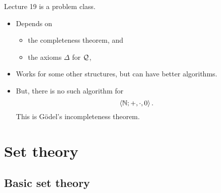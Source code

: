 
Lecture 19 is a problem class.


\begin{note*}
\hfill
\begin{itemize}
\item Depends on
\begin{itemize}
\item the completeness theorem, and
\item the axioms $ \Delta $ for $ \mathcal{Q} $,
\end{itemize}
\item Works for some other structures, but can have better algorithms.
\item But, there is no such algorithm for
$$ \left\langle \mathbb{N}; +, \cdot, 0 \right\rangle. $$
This is G\"odel's incompleteness theorem.
\end{itemize}
\end{note*}

\pagebreak

\section{Set theory}

\setcounter{subsection}{-1}

\subsection{Basic set theory}

